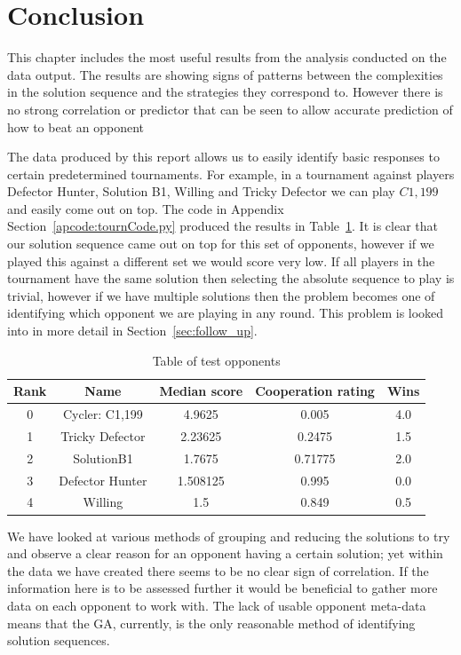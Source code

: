 \section{Conclusion}\label{sec:results_conclusion}
This chapter includes the most useful results from the analysis conducted on the data output.
The results are showing signs of patterns between the complexities in the solution sequence and the strategies they correspond to.
However there is no strong correlation or predictor that can be seen to allow accurate prediction of how to beat an opponent

The data produced by this report allows us to easily identify basic responses to certain predetermined tournaments.
For example, in a tournament against players Defector Hunter, Solution B1, Willing and Tricky Defector we can play $C1,199$ and easily come out on top.
The code in Appendix Section~\ref{apcode:tournCode.py} produced the results in Table~\ref{table:table_test_opsponents}.
It is clear that our solution sequence came out on top for this set of opponents, however if we played this against a different set we would score very low.
If all players in the tournament have the same solution then selecting the absolute sequence to play is trivial, however if we have multiple solutions then the problem becomes one of identifying which opponent we are playing in any round.
This problem is looked into in more detail in Section~\ref{sec:follow_up}. 

\begin{table}
    \centering
    \begin{tabular}{ccccc}
        \toprule    
        Rank & Name & Median score & Cooperation rating & Wins \\
        \midrule
        0 & Cycler: C1,199 & 4.9625 & 0.005 & 4.0 \\ 
        1 & Tricky Defector & 2.23625 & 0.2475 & 1.5 \\ 
        2 & SolutionB1 & 1.7675 & 0.71775 & 2.0 \\ 
        3 & Defector Hunter & 1.508125 & 0.995 & 0.0 \\ 
        4 & Willing & 1.5 & 0.849 & 0.5 \\ 
        \bottomrule
    \end{tabular}
    \caption{Table of test opponents}\label{table:table_test_opsponents}
\end{table}


We have looked at various methods of grouping and reducing the solutions to try and observe a clear reason for an opponent having a certain solution; yet within the data we have created there seems to be no clear sign of correlation.
If the information here is to be assessed further it would be beneficial to gather more data on each opponent to work with. 
The lack of usable opponent meta-data means that the GA, currently, is the only reasonable method of identifying solution sequences. 

